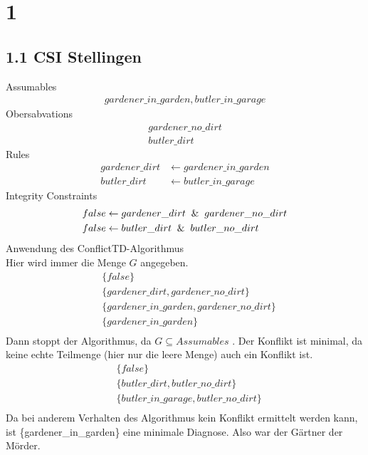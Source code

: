 \documentclass[a4paper,11pt,fleqn]{scrartcl}
\title{\titleinfo}
\author{\authorinfo}
\begin{document}
\maketitle
\notag

\section*{1}
\subsection*{1.1 CSI Stellingen}

Assumables 
\begin{align*}
gardener\_in\_garden, butler\_in\_garage
\end{align*}
Obersabvations
\begin{align*}
 gardener\_no\_dirt\\
 butler\_dirt
\end{align*}
Rules
\begin{align*}
 gardener\_dirt &\gets gardener\_in\_garden\\
 butler\_dirt &\gets butler\_in\_garage 
\end{align*}
Integrity Constraints
 \begin{align*}
  false &\gets gardener\_dirt \And gardener\_no\_dirt\\
  false &\gets butler\_dirt \And butler\_no\_dirt 
 \end{align*}
Anwendung des ConflictTD-Algorithmus\\
Hier wird immer die Menge $G$ angegeben.\\ 
\begin{align*}
&\{false\}\\ %
&\{gardener\_dirt, gardener\_no\_dirt\}\\ %
&\{gardener\_in\_garden, gardener\_no\_dirt\}\\ %
&\{gardener\_in\_garden\}\\
\end{align*}
Dann stoppt der Algorithmus, da $G \subseteq Assumables$ . 
Der Konflikt ist minimal, da keine echte Teilmenge (hier nur die leere Menge) auch ein Konflikt ist.\\
\begin{align*}
&\{false\}\\
&\{butler\_dirt, butler\_no\_dirt\}\\
&\{butler\_in\_garage,butler\_no\_dirt\}\\
\end{align*}
Da bei anderem Verhalten des Algorithmus kein Konflikt ermittelt werden kann, ist \{gardener\_in\_garden\} eine minimale Diagnose.
Also war der Gärtner der Mörder.
\end{document}
